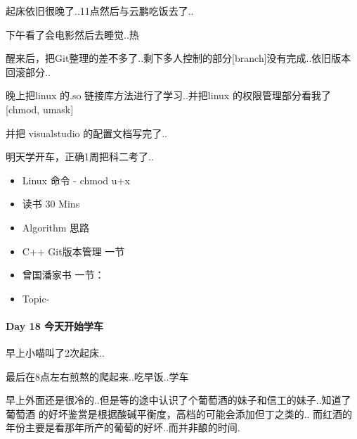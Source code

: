 \documentclass[UTF8,a4paper,8pt]{ctexart}
\begin{document}
	 	 起床依旧很晚了..11点然后与云鹏吃饭去了..
	 	 
	 	 下午看了会电影然后去睡觉..热
	 	 
	 	 醒来后，把Git整理的差不多了..剩下多人控制的部分[branch]没有完成..依旧版本回滚部分..
	 	 
	 	 晚上把linux 的.so 链接库方法进行了学习..并把linux 的权限管理部分看我了[chmod, umask]
	 	 
	 	 并把 visualstudio 的配置文档写完了..
	 	 
	 	 明天学开车，正确1周把科二考了..
	 	 \begin{itemize}
	 	 	\item  \makebox[0pt][l]{$\square$}\raisebox{.15ex}{\hspace{0.1em}$\checkmark$} Linux 命令 - chmod u+x
	 	 	
	 	 	\item  \makebox[0pt][l]{$\square$}\raisebox{.15ex}{\hspace{0.1em}$\checkmark$} 读书  30 Mins		 	 
	 	 	\item   Algorithm 思路
	 	 	\item  \makebox[0pt][l]{$\square$}\raisebox{.15ex}{\hspace{0.1em}$\checkmark$} C++ Git版本管理 一节
	 	 	
	 	 	\item  曾国潘家书 一节：
	 	 	\item  \makebox[0pt][l]{$\square$}\raisebox{.15ex}{\hspace{0.1em}$\checkmark$} Topic- 
	 	 \end{itemize}
 	 \paragraph{Day 18  今天开始学车    \quad     }
	 	 早上小喵叫了2次起床..
	 	 
	 	 最后在8点左右煎熬的爬起来..吃早饭..学车
	 	 
	 	 早上外面还是很冷的..但是等的途中认识了个葡萄酒的妹子和信工的妹子..知道了 葡萄酒 的好坏鉴赏是根据酸碱平衡度，高档的可能会添加但丁之类的.. 而红酒的年份主要是看那年所产的葡萄的好坏..而并非酿的时间.
	 	 
\end{document}
